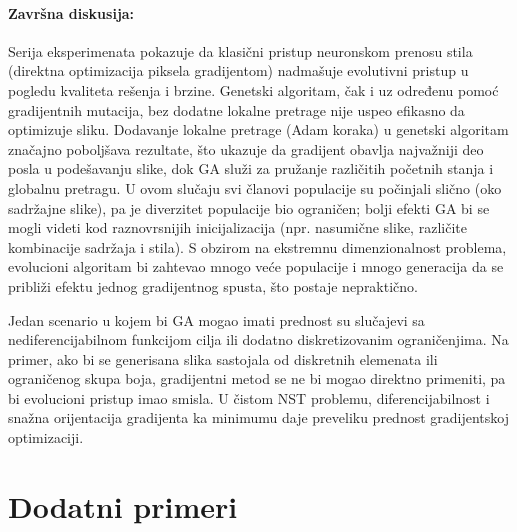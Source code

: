 \documentclass[a4paper,12pt]{article}
\begin{document}
\paragraph{Završna diskusija:} Serija eksperimenata pokazuje da klasični pristup neuronskom prenosu stila (direktna optimizacija piksela gradijentom) nadmašuje evolutivni pristup u pogledu kvaliteta rešenja i brzine. Genetski algoritam, čak i uz određenu pomoć gradijentnih mutacija, bez dodatne lokalne pretrage nije uspeo efikasno da optimizuje sliku. Dodavanje lokalne pretrage (Adam koraka) u genetski algoritam značajno poboljšava rezultate, što ukazuje da gradijent obavlja najvažniji deo posla u podešavanju slike, dok GA služi za pružanje različitih početnih stanja i globalnu pretragu. U ovom slučaju svi članovi populacije su počinjali slično (oko sadržajne slike), pa je diverzitet populacije bio ograničen; bolji efekti GA bi se mogli videti kod raznovrsnijih inicijalizacija (npr. nasumične slike, različite kombinacije sadržaja i stila). S obzirom na ekstremnu dimenzionalnost problema, evolucioni algoritam bi zahtevao mnogo veće populacije i mnogo generacija da se približi efektu jednog gradijentnog spusta, što postaje nepraktično.

Jedan scenario u kojem bi GA mogao imati prednost su slučajevi sa nediferencijabilnom funkcijom cilja ili dodatno diskretizovanim ograničenjima. Na primer, ako bi se generisana slika sastojala od diskretnih elemenata ili ograničenog skupa boja, gradijentni metod se ne bi mogao direktno primeniti, pa bi evolucioni pristup imao smisla. U čistom NST problemu, diferencijabilnost i snažna orijentacija gradijenta ka minimumu daje preveliku prednost gradijentskoj optimizaciji.
\newpage
\section{Dodatni primeri}
\end{document}
